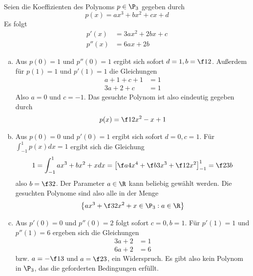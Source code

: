 \documentclass[a4paper]{scrartcl}
\begin{document}
\begin{aufgabe}~

	Seien die Koeffizienten des Polynoms $p\in \P_3$ gegeben durch
	\[
		p(x) = ax^3 + bx^2 + cx + d
	\]
	Es folgt
	\begin{align*}
		p'(x) &= 3ax^2 + 2bx + c \\
		p''(x) &= 6ax + 2b
	\end{align*}
	\begin{enumerate}[a)]
		\item
			Aus $p(0)=1$ und $p''(0)=1$ ergibt sich sofort $d=1, b=\f 12$.
			Außerdem für $p(1)=1$ und $p'(1)=1$ die Gleichungen
			\begin{align*}
				a + 1 + c + 1 &= 1\\
				3a + 2 + c &= 1
			\end{align*}
			Also $a=0$ und $c=-1$.
			Das gesuchte Polynom ist also eindeutig gegeben durch
			\[
				p(x) = \f 12 x^2 -x +1
			\]
		\item
			Aus $p(0)=0$ und $p'(0)=1$ ergibt sich sofort $d=0, c=1$.
			Für $\int_{-1}^1 p(x) dx = 1$ ergibt sich die Gleichung
			\[
				1 = \int_{-1}^1 ax^3 + bx^2 + x dx = \left[ \f a4 x^4 + \f b3 x^3 + \f 12 x^2\right]_{-1}^1
				= \f 23 b
			\]
			also $b=\f 32$.
			Der Parameter $a\in \R$ kann beliebig gewählt werden.
			Die gesuchten Polynome sind also alle in der Menge
			\[
				\left\{ax^3+\f 32 x^2 + x \in \P_3 : a\in \R \right\}
			\]
		\item
			Aus $p'(0)=0$ und $p''(0)=2$ folgt sofort $c=0, b=1$.
			Für $p'(1)=1$ und $p''(1)=6$ ergeben sich die Gleichungen
			\begin{align*}
				3a + 2 &= 1 \\
				6a + 2 &= 6
			\end{align*}
			bzw. $a=-\f 13$ und $a=\f 23$, ein Widerspruch.
			Es gibt also kein Polynom in $\P_3$, das die geforderten Bedingungen erfüllt.
	\end{enumerate}		
\end{aufgabe}
\end{document}
